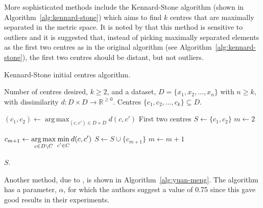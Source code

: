 \documentclass[a4paper]{report}
\DeclareMathOperator*{\argmax}{arg\,max}
\newcommand{\dset}{D}
\begin{document}
More sophisticated methods include the Kennard-Stone algorithm (shown in
Algorithm~\ref{alg:kennard-stone}) which aims to find $k$ centres that are
maximally separated in the metric space.  It is noted by
\citet{degroot1999selecting} that this method is sensitive to outliers and it
is suggested that, instead of picking maximally separated elements as the
first two centres as in the original algorithm (see
Algorithm~\ref{alg:kennard-stone}), the first two centres should be distant,
but not outliers.

\begin{algorithm}[h]
  \caption{Kennard-Stone initial centres algorithm.}
  \label{alg:kennard-stone}

  \begin{algorithmic}
    \Require Number of centres desired, $k \geq 2$, and a dataset, $\dset =
             \{x_1,x_2,\dotsc,x_n\}$ with $n \geq k$, with dissimilarity
             $d \colon \dset \times \dset \to \mathbb{R}^{\geq 0}$.
    \Ensure Centres $\{c_1,c_2,\dotsc,c_k\} \subseteq \dset$.

    \State $\displaystyle (c_1,c_2) \gets
            \argmax_{(c,c') \in \dset \times \dset} d(c,c')$ \Comment First
            two centres
    \State $S \gets \{c_1,c_2\}$
    \State $m \gets 2$

       \State $\displaystyle c_{m+1} \gets
               \argmax_{c \in \dset \setminus C}
               \min_{\raisebox{-.2em}{$\scriptstyle c' \in C$}} d(c,c')$
       \State $S \gets S \cup \{c_{m+1}\}$
       \State $m \gets m+1$
    \EndWhile

    \State \Return $S$.
  \end{algorithmic}
\end{algorithm}

Another method, due to \citet{yuan04initial}, is shown in
Algorithm~\ref{alg:yuan-meng}.  The algorithm has a parameter, $\alpha$, for
which the authors suggest a value of 0.75 since this gave good results in
their experiments.
\end{document}
